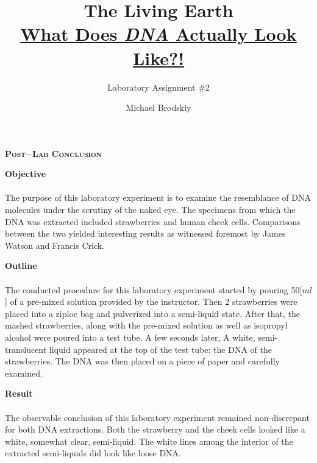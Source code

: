 \documentclass[12pt]{article}
\title{The Living Earth\\\underline{What Does \textbf{\textit{DNA}} Actually Look Like?!}}
\subtitle{Laboratory Assignment \#2}
\author{Michael Brodskiy}
\begin{document}
\maketitle
\begin{center} \textbf{\textsc{Post$-$Lab Conclusion}} \end{center} 
\newpage
{\setlength{\parindent}{0cm} \textbf{Objective}}
\paragraph{} The purpose of this laboratory experiment is to examine the resemblance of DNA molecules under the scrutiny of the naked eye.
    The specimens from which the DNA was extracted included strawberries and human cheek cells.
    Comparisons between the two yielded interesting results as witnessed foremost by James Watson and Francis Crick.
\begin{center}\end{center} 
{\setlength{\parindent}{0cm} \textbf{Outline}}
\paragraph{} The conducted procedure for this laboratory experiment started by pouring 50[$ml$] of a pre-mixed solution provided by the instructor. 
    Then 2 strawberries were placed into a ziploc bag and pulverized into a semi-liquid state. 
    After that, the mashed strawberries, along with the pre-mixed solution as well as isopropyl alcohol were poured into a test tube.
    A few seconds later, A white, semi-translucent liquid appeared at the top of the test tube: the DNA of the strawberries.
    The DNA was then placed on a piece of paper and carefully examined.  
\begin{center}\end{center} 
{\setlength{\parindent}{0cm} \textbf{Result}}
\paragraph{} The observable conclusion of this laboratory experiment remained non-discrepant for both DNA extractions. 
    Both the strawberry and the cheek cells looked like a white, somewhat clear, semi-liquid.
    The white lines among the interior of the extracted semi-liquids did look like loose DNA.
        \\
\end{document}
